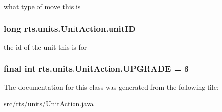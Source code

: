 \label{classrts_1_1units_1_1_unit_action_a17c35f7f6e20e9ddaf0beef22033ba16}
what type of move this is \hypertarget{classrts_1_1units_1_1_unit_action_a734ac068782831271b29ec3dc6726ddb}{
\subsubsection[{unitID}]{\setlength{\rightskip}{0pt plus 5cm}long {\bf rts.units.UnitAction.unitID}}}
\label{classrts_1_1units_1_1_unit_action_a734ac068782831271b29ec3dc6726ddb}
the id of the unit this is for \hypertarget{classrts_1_1units_1_1_unit_action_a5e2222e4d632ae47b64a7e7ae2fe82b1}{
\subsubsection[{UPGRADE}]{\setlength{\rightskip}{0pt plus 5cm}final int {\bf rts.units.UnitAction.UPGRADE} = 6}}
\label{classrts_1_1units_1_1_unit_action_a5e2222e4d632ae47b64a7e7ae2fe82b1}


The documentation for this class was generated from the following file:\begin{DoxyCompactItemize}
\item 
src/rts/units/\hyperlink{_unit_action_8java}{UnitAction.java}\end{DoxyCompactItemize}
